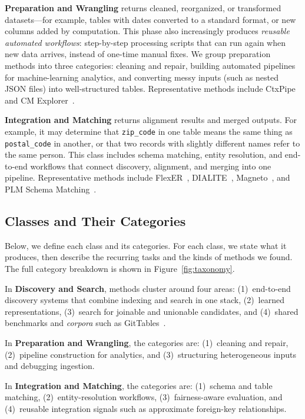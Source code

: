 \documentclass[sigconf]{acmart}
\begin{document}
\textbf{Preparation and Wrangling} returns cleaned, reorganized, or transformed datasets---for example, tables with dates converted to a standard format, or new columns added by computation. This phase also increasingly produces \emph{reusable automated workflows}: step-by-step processing scripts that can run again when new data arrives, instead of one-time manual fixes. We group preparation methods into three categories: cleaning and repair, building automated pipelines for machine-learning analytics, and converting messy inputs (such as nested JSON files) into well-structured tables. Representative methods include CtxPipe~\cite{10.1145/3698831} and CM Explorer~\cite{10.14778/3611540.3611595}.

\textbf{Integration and Matching} returns alignment results and merged outputs. For example, it may determine that \texttt{zip\_code} in one table means the same thing as \texttt{postal\_code} in another, or that two records with slightly different names refer to the same person. This class includes schema matching, entity resolution, and end-to-end workflows that connect discovery, alignment, and merging into one pipeline. Representative methods include FlexER~\cite{10.1145/3588722}, DIALITE~\cite{10.1145/3555041.3589732}, Magneto~\cite{10.14778/3742728.3742757}, and PLM Schema Matching~\cite{10184612}.


\subsection{Classes and Their Categories}
\label{sec:taxonomy-classes}
Below, we define each class and its categories. For each class, we state what it produces, then describe the recurring tasks and the kinds of methods we found. The full category breakdown is shown in Figure~\ref{fig:taxonomy}.

In \textbf{Discovery and Search}, methods cluster around four areas: (1)~end-to-end discovery systems that combine indexing and search in one stack, (2)~learned representations, (3)~search for joinable and unionable candidates, and (4)~shared benchmarks and \emph{corpora} such as GitTables~\cite{10.1145/3588710}.

In \textbf{Preparation and Wrangling}, the categories are: (1)~cleaning and repair, (2)~pipeline construction for analytics, and (3)~structuring heterogeneous inputs and debugging ingestion.

In \textbf{Integration and Matching}, the categories are: (1)~schema and table matching, (2)~entity-resolution workflows, (3)~fairness-aware evaluation, and (4)~reusable integration signals such as approximate foreign-key relationships.
\end{document}
